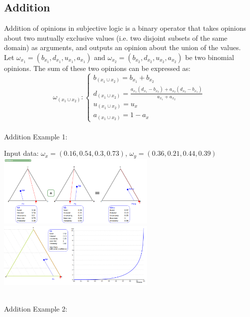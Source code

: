 \documentclass[UTF8]{article}
\newcommand{\opinion}[5]{$\omega_{#1} = (#2, #3, #4, #5)$}
\begin{document}
\subsection{Addition}
Addition of opinions in subjective logic is a binary operator that takes opinions
about two mutually exclusive values (i.e. two disjoint subsets of the same domain)
as arguments, and outputs an opinion about the union of the values.\\
Let \opinion{x_1}{b_{x_1}}{d_{x_1}}{u_{x_1}}{a_{x_1}} and \opinion{x_2}{b_{x_2}}{d_{x_2}}{u_{x_2}}{a_{x_2}} be two binomial opinions. The sum of these two opinions can be expressed as:
$$
\omega_{(x_1 \cup x_2)}: 
\begin{cases}
    b_{(x_1 \cup x_2)} = b_{x_1} + b_{x_2}\\    
    d_{(x_1 \cup x_2)} = \frac{a_{x_1}(d_{x_1} - b_{x_2}) + a_{x_2}(d_{x_2} - b_{x_1})}{a_{x_1} + a_{x_2}}\\
    u_{(x_1 \cup x_2)} = u_x\\
    a_{(x_1 \cup x_2)} = 1 - a_x
\end{cases}
$$\\
Addition Example 1:\\
\begin{center}
    Input data: 
    \opinion{x}{0.16}{0.54}{0.3}{0.73}, 
    \opinion{y}{0.36}{0.21}{0.44}{0.39}\\
    \includegraphics[width=3in]{images/add1.png}
    \includegraphics[width=3in]{images/add1viz.png}
\end{center}
\hrulefill\\
Addition Example 2:
\end{document}
